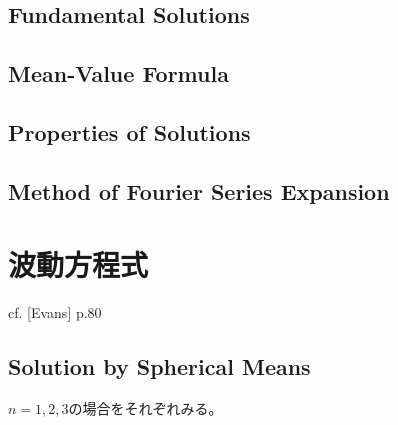 \documentclass[report]{jlreq}
\begin{document}
\begin{example}[同次1次元熱伝導方程式]
    \TODO{}
\end{example}

\begin{example}
    \TODO{}
\end{example}

\section{Fundamental Solutions}

\section{Mean-Value Formula}

\section{Properties of Solutions}

\section{Method of Fourier Series Expansion}



%
\chapter{波動方程式}

\begin{example}[1次元波動方程式]
    
\end{example}

\begin{example}[2次元波動方程式]
    
\end{example}

\begin{example}
    cf. [Evans] p.80
\end{example}

\section{Solution by Spherical Means}

$n = 1, 2, 3$の場合をそれぞれみる。
\end{document}
